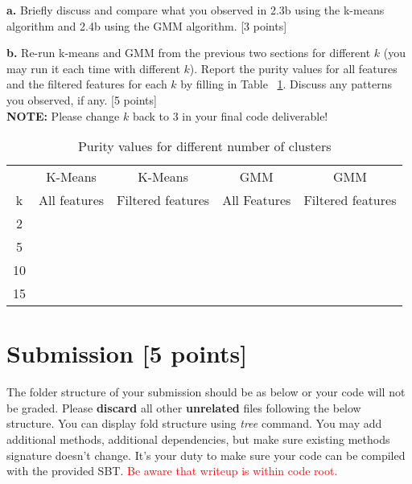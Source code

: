 \documentclass[12pt]{article}
\begin{document}
\textbf{a.} Briefly discuss and compare what you observed in 2.3b using the k-means algorithm and 2.4b using the GMM algorithm. [3 points]

\textbf{b.} Re-run k-means and GMM from the previous two sections for different $k$ (you may run it each time with different $k$). Report the purity values for all features and the filtered features for each $k$ by filling in Table ~\ref{tbl:kpurity}. Discuss any patterns you observed, if any. [5 points]\\

\textbf{NOTE:} Please change $k$ back to 3 in your final code deliverable!

\begin{table}[h]
\centering
\begin{tabular}{ c | c | c | c | c}
  \hline
   & K-Means & K-Means & GMM & GMM\\
  k & All features & Filtered features & All Features & Filtered features \\
  \hline
  2 &   &  &  & \\
  5 &   &  &  & \\
  10 &   &  &  & \\
  15 &   &  &  & \\
  \hline  
\end{tabular}
\caption{Purity values for different number of clusters}
\label{tbl:kpurity}
\end{table}

\section{Submission [5 points]}
The folder structure of your submission should be as below or your code will not be graded. Please \textbf{discard} all other \textbf{unrelated} files following the below structure. You can display fold structure using \textit{tree} command. You may add additional methods, additional dependencies, but make sure  existing methods signature doesn't change. It's your duty to make sure your code can be compiled with the provided SBT. \textcolor{red}{Be aware that writeup is within code root.} \\
\end{document}
